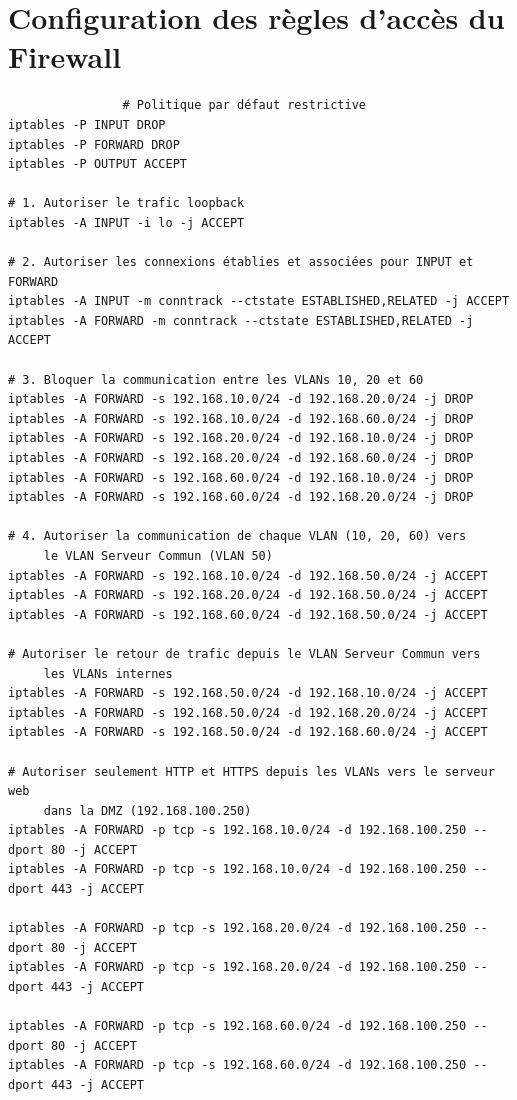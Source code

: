 \documentclass[a4paper,12pt]{report}
\begin{document}
            \section{Configuration des règles d'accès du Firewall}
            \begin{verbatim}
                # Politique par défaut restrictive
iptables -P INPUT DROP
iptables -P FORWARD DROP
iptables -P OUTPUT ACCEPT

# 1. Autoriser le trafic loopback
iptables -A INPUT -i lo -j ACCEPT

# 2. Autoriser les connexions établies et associées pour INPUT et FORWARD
iptables -A INPUT -m conntrack --ctstate ESTABLISHED,RELATED -j ACCEPT
iptables -A FORWARD -m conntrack --ctstate ESTABLISHED,RELATED -j ACCEPT

# 3. Bloquer la communication entre les VLANs 10, 20 et 60
iptables -A FORWARD -s 192.168.10.0/24 -d 192.168.20.0/24 -j DROP
iptables -A FORWARD -s 192.168.10.0/24 -d 192.168.60.0/24 -j DROP
iptables -A FORWARD -s 192.168.20.0/24 -d 192.168.10.0/24 -j DROP
iptables -A FORWARD -s 192.168.20.0/24 -d 192.168.60.0/24 -j DROP
iptables -A FORWARD -s 192.168.60.0/24 -d 192.168.10.0/24 -j DROP
iptables -A FORWARD -s 192.168.60.0/24 -d 192.168.20.0/24 -j DROP

# 4. Autoriser la communication de chaque VLAN (10, 20, 60) vers
     le VLAN Serveur Commun (VLAN 50)
iptables -A FORWARD -s 192.168.10.0/24 -d 192.168.50.0/24 -j ACCEPT
iptables -A FORWARD -s 192.168.20.0/24 -d 192.168.50.0/24 -j ACCEPT
iptables -A FORWARD -s 192.168.60.0/24 -d 192.168.50.0/24 -j ACCEPT

# Autoriser le retour de trafic depuis le VLAN Serveur Commun vers
     les VLANs internes
iptables -A FORWARD -s 192.168.50.0/24 -d 192.168.10.0/24 -j ACCEPT
iptables -A FORWARD -s 192.168.50.0/24 -d 192.168.20.0/24 -j ACCEPT
iptables -A FORWARD -s 192.168.50.0/24 -d 192.168.60.0/24 -j ACCEPT

# Autoriser seulement HTTP et HTTPS depuis les VLANs vers le serveur web
     dans la DMZ (192.168.100.250)
iptables -A FORWARD -p tcp -s 192.168.10.0/24 -d 192.168.100.250 --dport 80 -j ACCEPT
iptables -A FORWARD -p tcp -s 192.168.10.0/24 -d 192.168.100.250 --dport 443 -j ACCEPT

iptables -A FORWARD -p tcp -s 192.168.20.0/24 -d 192.168.100.250 --dport 80 -j ACCEPT
iptables -A FORWARD -p tcp -s 192.168.20.0/24 -d 192.168.100.250 --dport 443 -j ACCEPT

iptables -A FORWARD -p tcp -s 192.168.60.0/24 -d 192.168.100.250 --dport 80 -j ACCEPT
iptables -A FORWARD -p tcp -s 192.168.60.0/24 -d 192.168.100.250 --dport 443 -j ACCEPT


\end{verbatim}
\end{document}

